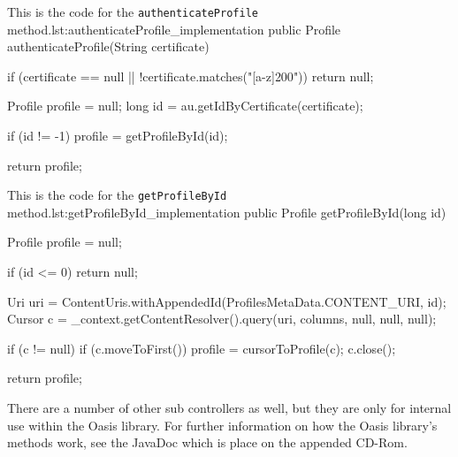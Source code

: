\begin{Java}{This is the code for the \texttt{authenticateProfile} method.}{lst:authenticateProfile_implementation}
public Profile authenticateProfile(String certificate) {
	if (certificate == null || !certificate.matches("[a-z]{200}")) {
		return null;
	}

	Profile profile = null;
	long id = au.getIdByCertificate(certificate);

	if (id != -1) {
		profile = getProfileById(id);
	}

	return profile;
}
\end{Java}

\begin{Java}{This is the code for the \texttt{getProfileById} method.}{lst:getProfileById_implementation}
public Profile getProfileById(long id) {
	Profile profile = null;
	
	if (id <= 0) {
		return null;
	}
	
	Uri uri = ContentUris.withAppendedId(ProfilesMetaData.CONTENT_URI, id);
	Cursor c = _context.getContentResolver().query(uri, columns, null, null, null);

	if (c != null) {
		if (c.moveToFirst()) {
			profile = cursorToProfile(c);
		}
		c.close();
	}

	return profile;
}
\end{Java}



There are a number of other sub controllers as well, but they are only for internal use within the Oasis library.
For further information on how the Oasis library's methods work, see the JavaDoc which is place on the appended CD-Rom.